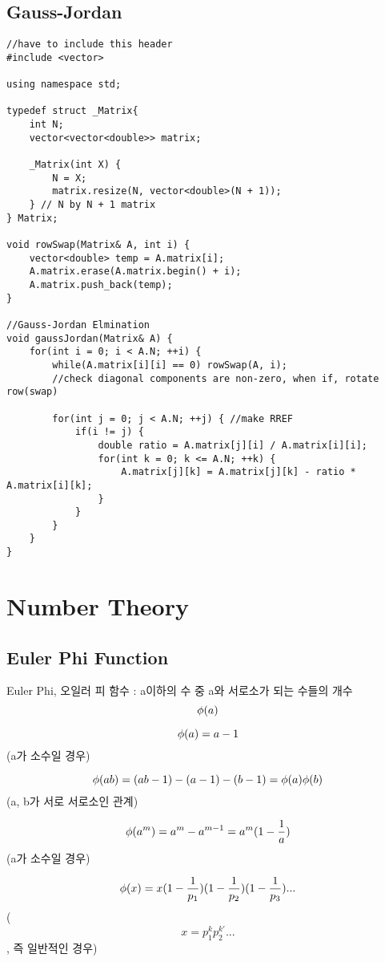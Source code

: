 \documentclass[landscape, 8pt, a4paper, oneside, twocolumn]{extarticle}
\begin{document}
\subsection{Gauss-Jordan}
\begin{verbatim}
//have to include this header
#include <vector>

using namespace std;

typedef struct _Matrix{
    int N;
    vector<vector<double>> matrix;

    _Matrix(int X) {
        N = X;
        matrix.resize(N, vector<double>(N + 1));
    } // N by N + 1 matrix
} Matrix;

void rowSwap(Matrix& A, int i) {
    vector<double> temp = A.matrix[i];
    A.matrix.erase(A.matrix.begin() + i);
    A.matrix.push_back(temp);
}

//Gauss-Jordan Elmination
void gaussJordan(Matrix& A) {
    for(int i = 0; i < A.N; ++i) {
        while(A.matrix[i][i] == 0) rowSwap(A, i); 
        //check diagonal components are non-zero, when if, rotate row(swap)

        for(int j = 0; j < A.N; ++j) { //make RREF
            if(i != j) {
                double ratio = A.matrix[j][i] / A.matrix[i][i];
                for(int k = 0; k <= A.N; ++k) {
                    A.matrix[j][k] = A.matrix[j][k] - ratio * A.matrix[i][k];
                }
            }
        }
    }
}
\end{verbatim}

\section{Number Theory}
\subsection{Euler Phi Function}
Euler Phi, 
오일러 피 함수 : a이하의 수 중 a와 서로소가 되는 수들의 개수   $$\large \phi(a)$$

$$\large \phi(a)=a-1$$ (a가 소수일 경우)

$$\large \phi(ab)=(ab-1)-(a-1)-(b-1)=\phi(a)\phi(b)$$ (a, b가 서로 서로소인 관계)

$$\large \phi(a^{m})=a^{m}-a^{m-1}=a^{m}(1-\frac{1}{a})$$(a가 소수일 경우)

$$\large \phi(x)=x(1-\frac{1}{p_{1}})(1-\frac{1}{p_{2}})(1-\frac{1}{p_{3}})...$$ ($$x = p_{1} ^ {k} p_{2} ^ {k'}...$$  , 즉 일반적인 경우)
\end{document}
